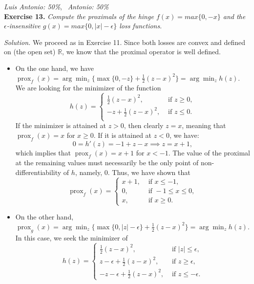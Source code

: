 \documentclass[12pt]{article}
\begin{document}
\vspace{.5em}

\textit{Luis Antonio: 50\%}, \ \textit{Antonio: 50\%}\\
\textbf{Exercise 13. }\emph{Compute the proximals of the hinge \( f(x) = max\{0, -x\}  \) and the \( \epsilon \)-insensitive \( g(x)=max\{0, |x| - \epsilon\} \) loss functions}.

\emph{Solution.} We proceed as in Exercise 11. Since both losses are convex and defined on (the open set) $\mathbb R$, we know that the proximal operator is well defined.
\begin{itemize}
    \item On the one hand, we have \( \operatorname{prox}_f(x) = \arg\min_z\{\max\{0, -z\} + \frac{1}{2} (z - x)^2 \} = \arg\min_z h(z) \). We are looking for the minimizer of the function
        \[
             h(z) = \begin{cases}
                 \frac{1}{2} (z - x)^2, &\text{ if } z \geq 0,\\
                -z + \frac{1}{2} (z - x)^2, &\text{ if } z \leq 0.\\
             \end{cases}
        \]
        If the minimizer is attained at $z> 0$, then clearly $z=x$, meaning that $\operatorname{prox}_f(x)=x$ for $x\geq 0$. If it is attained at $z<0$, we have:
        \[
        0=h'(z)= -1 + z - x \implies z = x+1,
        \]
        which implies that $\operatorname{prox}_f(x)=x+1$ for $x< -1$. The value of the proximal at the remaining values must necessarily be the only point of non-differentiability of $h$, namely, $0$. Thus, we have shown that
        \[
             \operatorname{prox}_f(x)= \begin{cases}
             x+1, & \text{ if } x\leq -1,\\
               0, & \text{ if } -1 \leq x \leq 0,\\
              x, & \text{ if } x \geq 0.
           \end{cases}
        \]
    \item On the other hand, \( \operatorname{prox}_g(x) = \arg\min_z\{\max\{0, |z| -\epsilon\} + \frac{1}{2} (z - x)^2 \} = \arg\min_z h(z) \). In this case, we seek the minimizer of
        \[
             h(z)= \begin{cases}
                \frac{1}{2} (z - x)^2, &\text{ if } |z| \leq \epsilon,\\
                z - \epsilon + \frac{1}{2} (z - x)^2, &\text{ if }   z \geq \epsilon,\\
                -z - \epsilon + \frac{1}{2} (z - x)^2, &\text{ if }   z \leq -\epsilon.
             \end{cases}
        \]


\end{itemize}
\end{document}
